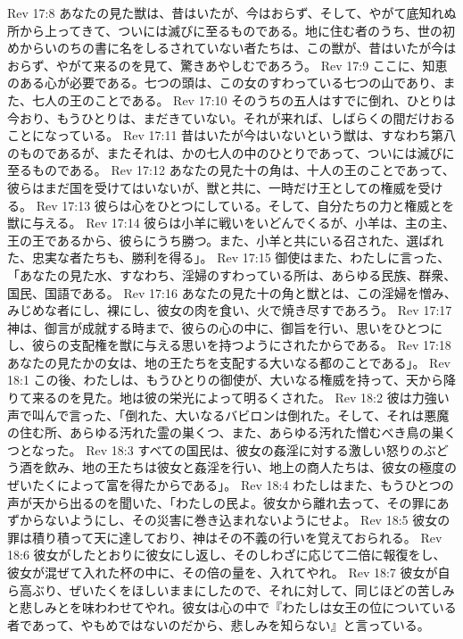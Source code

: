Rev 17:8  あなたの見た獣は、昔はいたが、今はおらず、そして、やがて底知れぬ所から上ってきて、ついには滅びに至るものである。地に住む者のうち、世の初めからいのちの書に名をしるされていない者たちは、この獣が、昔はいたが今はおらず、やがて来るのを見て、驚きあやしむであろう。
Rev 17:9  ここに、知恵のある心が必要である。七つの頭は、この女のすわっている七つの山であり、また、七人の王のことである。
Rev 17:10  そのうちの五人はすでに倒れ、ひとりは今おり、もうひとりは、まだきていない。それが来れば、しばらくの間だけおることになっている。
Rev 17:11  昔はいたが今はいないという獣は、すなわち第八のものであるが、またそれは、かの七人の中のひとりであって、ついには滅びに至るものである。
Rev 17:12  あなたの見た十の角は、十人の王のことであって、彼らはまだ国を受けてはいないが、獣と共に、一時だけ王としての権威を受ける。
Rev 17:13  彼らは心をひとつにしている。そして、自分たちの力と権威とを獣に与える。
Rev 17:14  彼らは小羊に戦いをいどんでくるが、小羊は、主の主、王の王であるから、彼らにうち勝つ。また、小羊と共にいる召された、選ばれた、忠実な者たちも、勝利を得る」。
Rev 17:15  御使はまた、わたしに言った、「あなたの見た水、すなわち、淫婦のすわっている所は、あらゆる民族、群衆、国民、国語である。
Rev 17:16  あなたの見た十の角と獣とは、この淫婦を憎み、みじめな者にし、裸にし、彼女の肉を食い、火で焼き尽すであろう。
Rev 17:17  神は、御言が成就する時まで、彼らの心の中に、御旨を行い、思いをひとつにし、彼らの支配権を獣に与える思いを持つようにされたからである。
Rev 17:18  あなたの見たかの女は、地の王たちを支配する大いなる都のことである」。
Rev 18:1  この後、わたしは、もうひとりの御使が、大いなる権威を持って、天から降りて来るのを見た。地は彼の栄光によって明るくされた。
Rev 18:2  彼は力強い声で叫んで言った、「倒れた、大いなるバビロンは倒れた。そして、それは悪魔の住む所、あらゆる汚れた霊の巣くつ、また、あらゆる汚れた憎むべき鳥の巣くつとなった。
Rev 18:3  すべての国民は、彼女の姦淫に対する激しい怒りのぶどう酒を飲み、地の王たちは彼女と姦淫を行い、地上の商人たちは、彼女の極度のぜいたくによって富を得たからである」。
Rev 18:4  わたしはまた、もうひとつの声が天から出るのを聞いた、「わたしの民よ。彼女から離れ去って、その罪にあずからないようにし、その災害に巻き込まれないようにせよ。
Rev 18:5  彼女の罪は積り積って天に達しており、神はその不義の行いを覚えておられる。
Rev 18:6  彼女がしたとおりに彼女にし返し、そのしわざに応じて二倍に報復をし、彼女が混ぜて入れた杯の中に、その倍の量を、入れてやれ。
Rev 18:7  彼女が自ら高ぶり、ぜいたくをほしいままにしたので、それに対して、同じほどの苦しみと悲しみとを味わわせてやれ。彼女は心の中で『わたしは女王の位についている者であって、やもめではないのだから、悲しみを知らない』と言っている。
